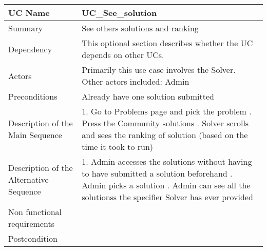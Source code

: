 \begin{table}[htbp]
\centering
\begin{tabularx}{\textwidth}{|l|X|}
\hline
UC Name & UC\_See\_solution \\ \hline

Summary &  See others solutions and ranking \\ \hline

Dependency & This optional section describes whether the UC depends on other UCs. \\ \hline

Actors & Primarily this use case involves the Solver. Other actors included: Admin \\ \hline

Preconditions & Already have one solution submitted \\ \hline

Description of the Main Sequence & 1.	Go to Problems page and pick the problem  \newline  2. Press the Community solutions   \newline 3.	Solver scrolls and sees the ranking of solution (based on the time it took to run) \\ \hline

Description of the Alternative Sequence & 1.	Admin accesses the solutions without having to have submitted a solution beforehand \newline 2. Admin picks a solution \newline 3.	Admin can see all the solutionss the specifier Solver has ever provided \\ \hline

Non functional requirements & \- \\ \hline

Postcondition & \- \\ \hline

\end{tabularx}
\end{table}

